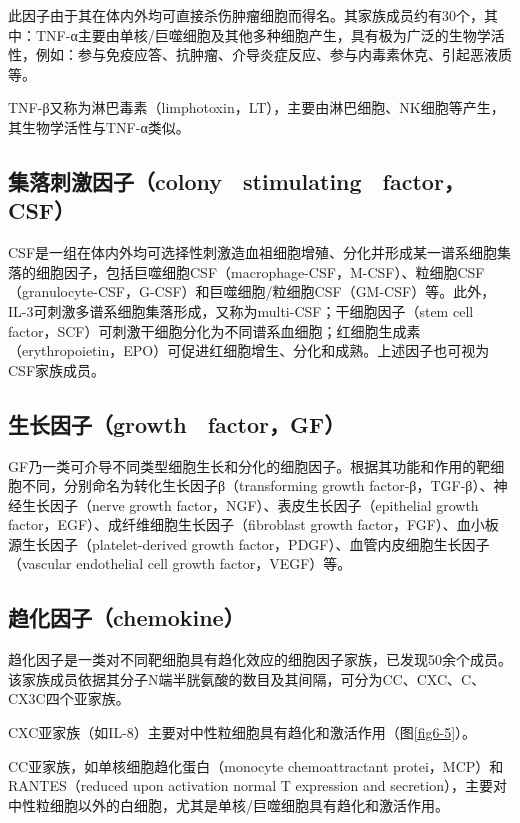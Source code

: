 此因子由于其在体内外均可直接杀伤肿瘤细胞而得名。其家族成员约有30个，其中：TNF-α主要由单核/巨噬细胞及其他多种细胞产生，具有极为广泛的生物学活性，例如：参与免疫应答、抗肿瘤、介导炎症反应、参与内毒素休克、引起恶液质等。

TNF-β又称为淋巴毒素（limphotoxin，LT），主要由淋巴细胞、NK细胞等产生，其生物学活性与TNF-α类似。


\subsection{集落刺激因子（colony　stimulating　factor，CSF）}

CSF是一组在体内外均可选择性刺激造血祖细胞增殖、分化并形成某一谱系细胞集落的细胞因子，包括巨噬细胞CSF（macrophage-CSF，M-CSF）、粒细胞CSF（granulocyte-CSF，G-CSF）和巨噬细胞/粒细胞CSF（GM-CSF）等。此外，IL-3可刺激多谱系细胞集落形成，又称为multi-CSF；干细胞因子（stem
cell
factor，SCF）可刺激干细胞分化为不同谱系血细胞；红细胞生成素（erythropoietin，EPO）可促进红细胞增生、分化和成熟。上述因子也可视为CSF家族成员。


\subsection{生长因子（growth　factor，GF）}

GF乃一类可介导不同类型细胞生长和分化的细胞因子。根据其功能和作用的靶细胞不同，分别命名为转化生长因子β（transforming
growth factor-β，TGF-β）、神经生长因子（nerve growth
factor，NGF）、表皮生长因子（epithelial growth
factor，EGF）、成纤维细胞生长因子（fibroblast growth
factor，FGF）、血小板源生长因子（platelet-derived growth
factor，PDGF）、血管内皮细胞生长因子（vascular endothelial cell growth
factor，VEGF）等。


\subsection{趋化因子（chemokine）}

趋化因子是一类对不同靶细胞具有趋化效应的细胞因子家族，已发现50余个成员。该家族成员依据其分子N端半胱氨酸的数目及其间隔，可分为CC、CXC、C、CX3C四个亚家族。

CXC亚家族（如IL-8）主要对中性粒细胞具有趋化和激活作用（图\ref{fig6-5}）。

CC亚家族，如单核细胞趋化蛋白（monocyte chemoattractant
protei，MCP）和RANTES（reduced upon activation normal T expression and
secretion），主要对中性粒细胞以外的白细胞，尤其是单核/巨噬细胞具有趋化和激活作用。

